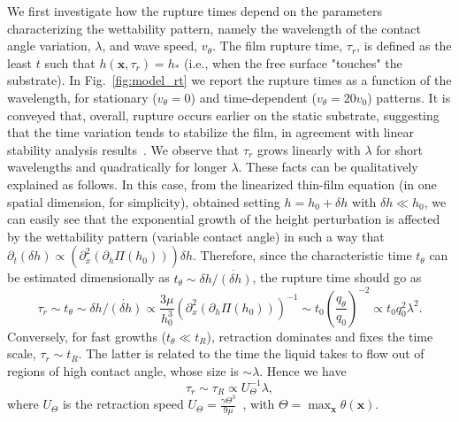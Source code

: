 \documentclass[amsmath,amssymb,showpacs,prf,superscriptaddress, longbibliography]{revtex4-1} %
\begin{document}
 We first investigate how the rupture times depend on the parameters characterizing the wettability pattern, namely the wavelength of the contact angle variation, $\lambda$, and wave speed, $v_{\theta}$.
The film rupture time, $\tau_r$, is defined as the least $t$ such that $h(\mathbf{x},\tau_r)=h_{\ast}$ (i.e., when the free surface "touches" the substrate).
In Fig.~\ref{fig:model_rt} we report the rupture times as a function of the wavelength, for stationary ($v_{\theta}=0$) and time-dependent ($v_{\theta}=20 v_0$) patterns. 
It is conveyed that, overall, rupture occurs earlier on the static substrate, suggesting that the time variation tends to stabilize the film, in agreement with linear stability analysis results~\cite{sumanDynamicsThinLiquid2006}.
We observe that $\tau_r$ grows linearly with $\lambda$ for short wavelengths and quadratically for longer $\lambda$.
These facts can be qualitatively explained as follows. 
In this case, from the linearized thin-film equation (in one spatial dimension, for simplicity), obtained setting $h=h_0 + \delta h$ with $\delta h \ll h_0$, 
we can easily see that the exponential growth of the height perturbation is affected by the wettability pattern (variable contact angle) in such a way that $\partial_t (\delta h) \propto (\partial_x^2 (\partial_h\Pi(h_0))) \delta h$. Therefore, since the characteristic time $t_{\theta}$ can be estimated dimensionally as $t_{\theta} \sim \delta h/\dot{(\delta h)}$, the rupture time should go as
\begin{equation}\label{eq:taur_l2}
    \tau_r \sim t_{\theta} \sim  \delta h/\dot{(\delta h)} \propto \frac{3\mu}{h_0^3}(\partial_x^2 (\partial_h\Pi (h_0)))^{-1} \sim t_0 \left(\frac{q_{\theta}}{q_0}\right)^{-2} \propto t_0 q_0^2 \lambda^2.
\end{equation}
Conversely, for fast growths ($t_{\theta} \ll t_R$), retraction dominates and fixes the time scale, $\tau_r \sim t_R$. 
The latter is related to the time the liquid takes to flow out of regions of high contact angle, whose size is $\sim \lambda$. Hence we have 
\begin{equation}\label{eq:taur_l1}
 \tau_r \sim \tau_R \propto U_{\Theta}^{-1}\lambda,
\end{equation}
where $U_{\Theta}$ is the retraction speed $U_{\Theta} = \frac{\gamma \Theta^3}{9\mu}$~\cite{edwardsNotSpreadingReverse2016a}, with $\Theta = \max_{\mathbf{x}}\theta(\mathbf{x})$.
\end{document}
